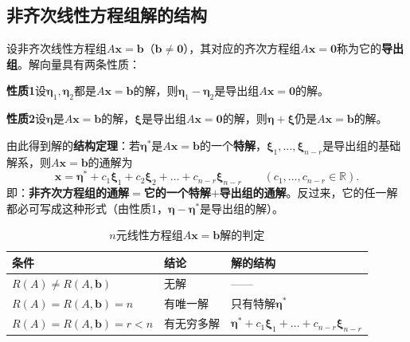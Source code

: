 \subsection{非齐次线性方程组解的结构}
设非齐次线性方程组$A\boldsymbol{x}=\boldsymbol{b}$（$\boldsymbol{b}\ne\boldsymbol{0}$），其对应的齐次方程组$A\boldsymbol{x}=\boldsymbol{0}$称为它的\textbf{导出组}。解向量具有两条性质：

\textbf{性质1}\quad 设$\boldsymbol{\eta}_1,\boldsymbol{\eta}_2$都是$A\boldsymbol{x}=\boldsymbol{b}$的解，则$\boldsymbol{\eta}_1-\boldsymbol{\eta}_2$是导出组$A\boldsymbol{x}=\boldsymbol{0}$的解。

\textbf{性质2}\quad 设$\boldsymbol{\eta}$是$A\boldsymbol{x}=\boldsymbol{b}$的解，$\boldsymbol{\xi}$是导出组$A\boldsymbol{x}=\boldsymbol{0}$的解，则$\boldsymbol{\eta}+\boldsymbol{\xi}$仍是$A\boldsymbol{x}=\boldsymbol{b}$的解。

由此得到解的\textbf{结构定理}：若$\boldsymbol{\eta}^{*}$是$A\boldsymbol{x}=\boldsymbol{b}$的一个\textbf{特解}，$\boldsymbol{\xi}_1,\dots,\boldsymbol{\xi}_{n-r}$是导出组的基础解系，则$A\boldsymbol{x}=\boldsymbol{b}$的通解为
\[
\boldsymbol{x}=\boldsymbol{\eta}^{*}+c_1\boldsymbol{\xi}_1+c_2\boldsymbol{\xi}_2+\dots+c_{n-r}\boldsymbol{\xi}_{n-r}
\qquad(c_1,\dots,c_{n-r}\in\mathbb{R}).
\]
即：\textbf{非齐次方程组的通解$=$它的一个特解$+$导出组的通解}。反过来，它的任一解都必可写成这种形式（由性质1，$\boldsymbol{\eta}-\boldsymbol{\eta}^{*}$是导出组的解）。



\begin{table}[htbp]
\centering
\caption{$n$元线性方程组$A\boldsymbol{x}=\boldsymbol{b}$解的判定}
\begin{tabular}{@{}lll@{}}
\toprule
条件 & 结论 & 解的结构\\
\midrule
$R(A)\ne R(A,\boldsymbol{b})$ & 无解 & ——\\
$R(A)=R(A,\boldsymbol{b})=n$ & 有唯一解 & 只有特解$\boldsymbol{\eta}^{*}$\\
$R(A)=R(A,\boldsymbol{b})=r<n$ & 有无穷多解 & $\boldsymbol{\eta}^{*}+c_1\boldsymbol{\xi}_1+\dots+c_{n-r}\boldsymbol{\xi}_{n-r}$\\
\bottomrule
\end{tabular}
\end{table}

